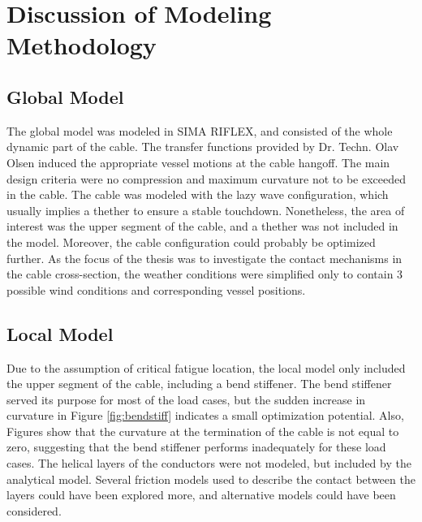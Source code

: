 \section{Discussion of Modeling Methodology}
\subsection{Global Model}
 The global model was modeled in SIMA RIFLEX, and consisted of the whole dynamic part of the cable. The transfer functions provided by Dr. Techn. Olav Olsen induced the appropriate vessel motions at the cable hangoff. The main design criteria were no compression and maximum curvature not to be exceeded in the cable.  The cable was modeled with the lazy wave configuration, which usually implies a thether to ensure a stable touchdown. Nonetheless, the area of interest was the upper segment of the cable, and a thether was not included in the model. Moreover, the cable configuration could probably be optimized further. As the focus of the thesis was to investigate the contact mechanisms in the cable cross-section, the weather conditions were simplified only to contain 3 possible wind conditions and corresponding vessel positions. 

\subsection{Local Model}
\label{sec:disclocmod}
Due to the assumption of critical fatigue location, the local model only included the upper segment of the cable, including a bend stiffener. The bend stiffener served its purpose for most of the load cases, but the sudden increase in curvature in Figure \ref{fig:bendstiff} indicates a small optimization potential. Also, Figures  show that the curvature at the termination of the cable is not equal to zero, suggesting that the bend stiffener performs inadequately for these load cases.   The helical layers of the conductors were not modeled, but included by the analytical model. Several friction models used to describe the contact between the layers could have been explored more, and alternative models could have been considered.

